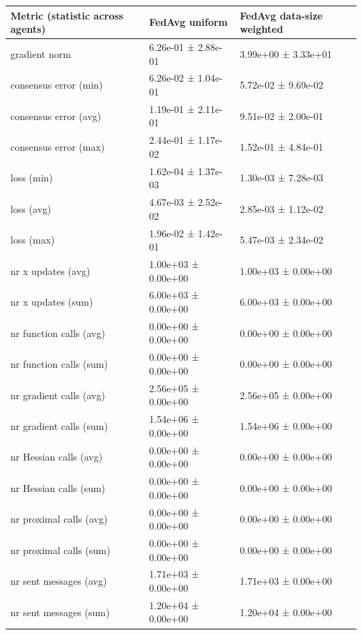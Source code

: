 \begin{tabular}{lll}
\hline
 Metric (statistic across agents)   & FedAvg uniform      & FedAvg data-size weighted   \\
\hline
 gradient norm                      & 6.26e-01 ± 2.88e-01 & 3.99e+00 ± 3.33e+01         \\
 consensus error (min)              & 6.26e-02 ± 1.04e-01 & 5.72e-02 ± 9.69e-02         \\
 consensus error (avg)              & 1.19e-01 ± 2.11e-01 & 9.51e-02 ± 2.00e-01         \\
 consensus error (max)              & 2.44e-01 ± 1.17e-02 & 1.52e-01 ± 4.84e-01         \\
 loss (min)                         & 1.62e-04 ± 1.37e-03 & 1.30e-03 ± 7.28e-03         \\
 loss (avg)                         & 4.67e-03 ± 2.52e-02 & 2.85e-03 ± 1.12e-02         \\
 loss (max)                         & 1.96e-02 ± 1.42e-01 & 5.47e-03 ± 2.34e-02         \\
 nr x updates (avg)                 & 1.00e+03 ± 0.00e+00 & 1.00e+03 ± 0.00e+00         \\
 nr x updates (sum)                 & 6.00e+03 ± 0.00e+00 & 6.00e+03 ± 0.00e+00         \\
 nr function calls (avg)            & 0.00e+00 ± 0.00e+00 & 0.00e+00 ± 0.00e+00         \\
 nr function calls (sum)            & 0.00e+00 ± 0.00e+00 & 0.00e+00 ± 0.00e+00         \\
 nr gradient calls (avg)            & 2.56e+05 ± 0.00e+00 & 2.56e+05 ± 0.00e+00         \\
 nr gradient calls (sum)            & 1.54e+06 ± 0.00e+00 & 1.54e+06 ± 0.00e+00         \\
 nr Hessian calls (avg)             & 0.00e+00 ± 0.00e+00 & 0.00e+00 ± 0.00e+00         \\
 nr Hessian calls (sum)             & 0.00e+00 ± 0.00e+00 & 0.00e+00 ± 0.00e+00         \\
 nr proximal calls (avg)            & 0.00e+00 ± 0.00e+00 & 0.00e+00 ± 0.00e+00         \\
 nr proximal calls (sum)            & 0.00e+00 ± 0.00e+00 & 0.00e+00 ± 0.00e+00         \\
 nr sent messages (avg)             & 1.71e+03 ± 0.00e+00 & 1.71e+03 ± 0.00e+00         \\
 nr sent messages (sum)             & 1.20e+04 ± 0.00e+00 & 1.20e+04 ± 0.00e+00         \\

\end{tabular}
